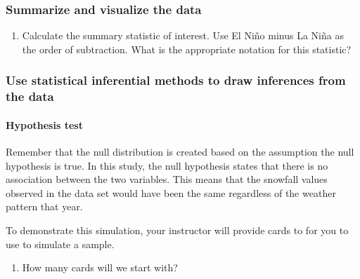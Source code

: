 \documentclass[
]{report}
\providecommand{\tightlist}{%
  \setlength{\itemsep}{0pt}\setlength{\parskip}{0pt}}
\newcommand\latexcode[1]{#1}
\begin{document}
\vspace{1in}

\hypertarget{summarize-and-visualize-the-data-4}{%
\subsubsection*{Summarize and visualize the data}\label{summarize-and-visualize-the-data-4}}

\begin{enumerate}
\def\labelenumi{\arabic{enumi}.}
\setcounter{enumi}{8}
\tightlist
\item
  Calculate the summary statistic of interest. Use El Ni\latexcode{\~{n}}o minus La Ni\latexcode{\~{n}}a as the order of subtraction. What is the appropriate notation for this statistic?
\end{enumerate}

\vspace{0.5in}

\newpage

\hypertarget{use-statistical-inferential-methods-to-draw-inferences-from-the-data-3}{%
\subsubsection*{Use statistical inferential methods to draw inferences from the data}\label{use-statistical-inferential-methods-to-draw-inferences-from-the-data-3}}

\hypertarget{hypothesis-test-2}{%
\paragraph*{Hypothesis test}\label{hypothesis-test-2}}

Remember that the null distribution is created based on the assumption the null hypothesis is true. In this study, the null hypothesis states that there is no association between the two variables. This means that the snowfall values observed in the data set would have been the same regardless of the weather pattern that year.

To demonstrate this simulation, your instructor will provide cards to for you to use to simulate a sample.

\begin{enumerate}
\def\labelenumi{\arabic{enumi}.}
\setcounter{enumi}{9}
\tightlist
\item
  How many cards will we start with?
\end{enumerate}
\end{document}
